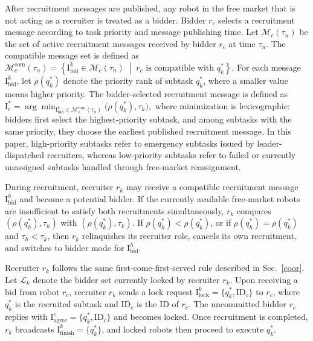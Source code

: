 \documentclass[lettersize,journal]{IEEEtran}
\begin{document}
After recruitment messages are published, any robot in the free market that is not acting as a recruiter is treated as a bidder. Bidder $r_c$ selects a recruitment message according to task priority and message publishing time. Let $\mathcal{M}_c(\tau_n)$ be the set of active recruitment messages received by bidder $r_c$ at time $\tau_n$. The compatible message set is defined as
$
\mathcal{M}^{\mathrm{com}}_c(\tau_n)
=\left\{\mathrm{I}_{\mathrm{bid}}^k \in \mathcal{M}_c(\tau_n)\;\middle|\;\text{$r_c$ is compatible with $q_k^\ast$}\right\}.
$
For each message $\mathrm{I}_{\mathrm{bid}}^k$, let $\rho(q_k^\ast)$ denote the priority rank of subtask $q_k^\ast$, where a smaller value means higher priority. The bidder-selected recruitment message is defined as
$
\mathrm{I}_c^\ast
=
\arg\min_{\mathrm{I}_{\mathrm{bid}}^k \in \mathcal{M}^{\mathrm{com}}_c(\tau_n)}
\bigl(\rho(q_k^\ast),\tau_k\bigr),
$
where minimization is lexicographic: bidders first select the highest-priority subtask, and among subtasks with the same priority, they choose the earliest published recruitment message. In this paper, high-priority subtasks refer to emergency subtasks issued by leader-dispatched recruiters, whereas low-priority subtasks refer to failed or currently unassigned subtasks handled through free-market reassignment.

During recruitment, recruiter $r_k$ may receive a compatible recruitment message $\mathrm{I}_{\mathrm{bid}}^h$ and become a potential bidder. If the currently available free-market robots are insufficient to satisfy both recruitments simultaneously, $r_k$ compares $(\rho(q_h^\ast),\tau_h)$ with $(\rho(q_k^\ast),\tau_k)$. If $\rho(q_h^\ast)<\rho(q_k^\ast)$, or if $\rho(q_h^\ast)=\rho(q_k^\ast)$ and $\tau_h<\tau_k$, then $r_k$ relinquishes its recruiter role, cancels its own recruitment, and switches to bidder mode for $\mathrm{I}_{\mathrm{bid}}^h$.

Recruiter $r_k$ follows the same first-come-first-served rule described in Sec.~\ref{coor}. Let $\mathcal{L}_k$ denote the bidder set currently locked by recruiter $r_k$. Upon receiving a bid from robot $r_c$, recruiter $r_k$ sends a lock request
$\mathrm{I}_{\mathrm{lock}}^k = \{q_k^\ast,\mathrm{ID}_c\}$
to $r_c$, where $q_k^\ast$ is the recruited subtask and $\mathrm{ID}_c$ is the ID of $r_c$. The uncommitted bidder $r_c$ replies with
$\mathrm{I}_{\mathrm{agree}}^c = \{q_k^\ast,\mathrm{ID}_c\}$
and becomes locked. Once recruitment is completed, $r_k$ broadcasts
$\mathrm{I}_{\mathrm{finish}}^k = \{q_k^\ast\}$,
and locked robots then proceed to execute $q_k^\ast$.
\end{document}
